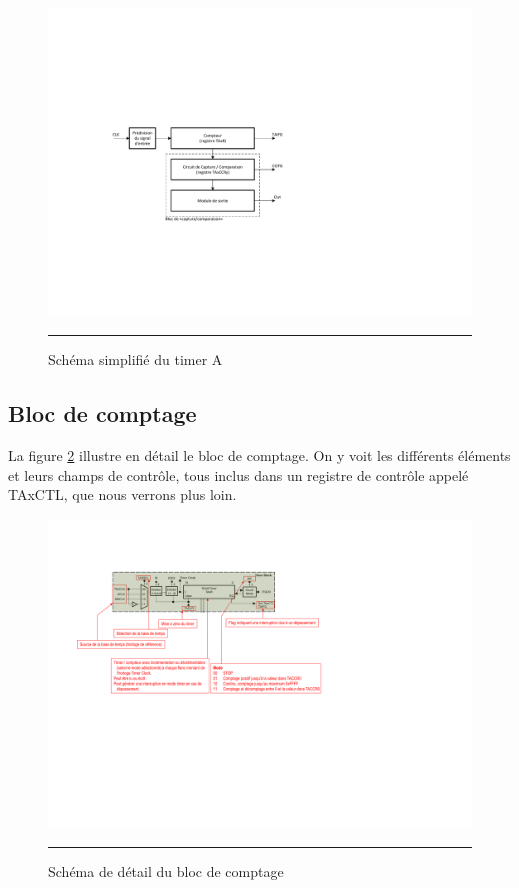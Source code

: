 \begin{figure}[htb]
  \centering
  \includegraphics[angle=0, width=14cm]{./Figures/Chap5_Timer/Timer_blocs_1.pdf}
  \rule{35em}{0.5pt}
  \caption[TimerA simplifie]{Schéma simplifié du timer A}
  \label{fig:TimerAsimplifie}
\end{figure}


\subsection{Bloc de comptage}
La figure \ref{fig:TimerTAR} illustre en détail le bloc de comptage. On y voit les différents éléments et leurs champs de contrôle, tous inclus dans un registre de contrôle appelé TAxCTL, que nous verrons plus loin.

\begin{figure}[H]
  \centering
  \includegraphics[angle=0, width=16cm]{./Figures/Chap5_Timer/Timer_Detail_1.pdf}
  \rule{35em}{0.5pt}
  \caption[TimerTAR]{Schéma de détail du bloc de comptage}
  \label{fig:TimerTAR}
\end{figure}

